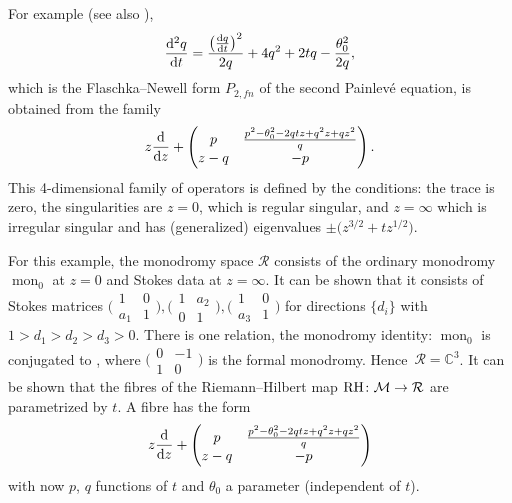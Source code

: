 \documentclass[10pt,a4paper]{amsart}
\numberwithin{equation}{section}
\begin{document}
For example (see also \cite[Section~4.9]{vdP-Sa}),
\[
\frac{{\rm d}^2q}{{\rm d}t}=\frac{\bigl(\frac{{\rm d}q}{{\rm d}t}\bigr)^2}{2q}+4q^2+2tq-\frac{\theta_0^2}{2q},
\]
 which is the Flaschka--Newell
form $P_{2,fn}$ of the second Painlev\'e equation, is obtained from the family \[z\frac{{\rm d}}{{\rm d}z}+ \left(\begin{matrix} p & \frac{p^2-\theta_0^2-2qtz+q^2z+qz^2}{q}\\ z-q & -p \end{matrix}\right). \]
This 4-dimensional family of operators is defined by the conditions:
the trace is zero, the singularities are $z=0$, which is regular singular, and $z=\infty$ which is irregular singular and
has (generalized) eigenvalues $\pm \bigl(z^{3/2}+tz^{1/2}\bigr)$.


 For this example, the monodromy space $\mathcal{R}$ consists of the ordinary monodromy $\operatorname{mon}_0$ at $z=0$ and Stokes
data at $z=\infty$. It can be shown that it consists of Stokes matrices
$\bigl(\begin{smallmatrix} 1 & 0\\a_1 &1\end{smallmatrix}\bigr), \bigl(\begin{smallmatrix} 1 & a_2\\0 &1\end{smallmatrix}\bigr), \bigl(\begin{smallmatrix} 1 & 0\\a_3 &1\end{smallmatrix}\bigr)$ for directions $\{d_i\}$ with $1>d_1>d_2>d_3>0$.
There is one relation, the monodromy identity:
$\operatorname{mon}_0$ is conjugated to
,
where $\bigl(\begin{smallmatrix} 0 & -1\\1 &0\end{smallmatrix}\bigr)$ is the formal monodromy. Hence~${\mathcal{R}=\mathbb{C}^3}$.
It can be shown that the fibres of the Riemann--Hilbert map ${\rm RH}\colon\mathcal{M}\rightarrow \mathcal{R}$ are parametrized
by $t$. A fibre has the form
\[
z\frac{{\rm d}}{{\rm d}z}+ \left(\begin{matrix} p & \frac{p^2-\theta_0^2-2qtz+q^2z+qz^2}{q}\\ z-q & -p \end{matrix}\right)
\]
with now $p$, $q$ functions of $t$ and $\theta_0$ a parameter (independent of $t$).
\end{document}
